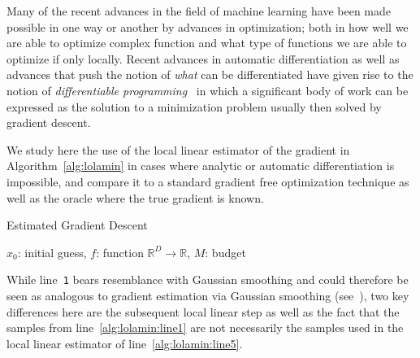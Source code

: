 Many of the recent advances in the field of machine learning have been made possible in one way or another by advances in optimization; both in how well we are able to optimize complex function and what type of functions we are able to optimize if only locally. Recent advances in automatic differentiation as well as advances that push the notion of \emph{what} can be differentiated have given rise to the notion of \emph{differentiable programming}~\citep{innesDifferentiableProgrammingSystem2019} in which a significant body of work can be expressed as the solution to a minimization problem usually then solved by gradient descent.

We study here the use of the local linear estimator of the gradient in Algorithm~\ref{alg:lolamin} in cases where analytic or automatic differentiation is impossible, and compare it to a standard gradient free optimization technique as well as the oracle where the true gradient is known.
\begin{algorithm}
    \caption{Estimated Gradient Descent}\label{alg:lolamin}
    \begin{algorithmic}[1] %
        \Require $x_0$: initial guess, $f$: function $\mathbb{R}^D \to \mathbb{R}$, $M$: budget
        \label{alg:lolamin:line1}
            \label{alg:lolamin:line5}
        \EndWhile
    \end{algorithmic}
\end{algorithm}
While line~\texttt{1} bears resemblance with Gaussian smoothing and could therefore be seen as analogous to gradient estimation via Gaussian smoothing (see~\cite{berahasTheoreticalEmpiricalComparison2020}), two key differences here are the subsequent local linear step as well as the fact that the samples from line~\ref{alg:lolamin:line1} are not necessarily the samples used in the local linear estimator of line~\ref{alg:lolamin:line5}. 

